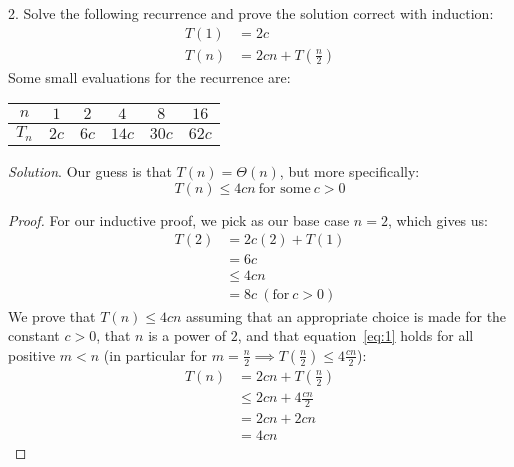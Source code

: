 \documentclass{scrartcl}
\begin{document}
\begin{flushleft}
    2. Solve the following recurrence and prove the solution correct with induction:
    \begin{align*}
        T(1) &= 2c\\
        T(n) &= 2cn + T(\frac{n}{2})
    \end{align*}
    Some small evaluations for the recurrence are:
    \medskip
    \begin{center}
        \begin{tabular}{|c|c|c|c|c|c|}
            \hline
            $n$ & $1$ & $2$ & $4$ & $8$ & $16$\\
            \hline
            $T_n$ & $2c$ & $6c$ & $14c$ & $30c$ & $62c$\\
            \hline
        \end{tabular}
    \end{center}
    \medskip
    \textit{Solution}. Our guess is that $T(n) = \Theta(n)$, but more specifically:
    \begin{equation}
        T(n) \leq 4cn\ \text{for some}\ c > 0
        \label{eq:1}
    \end{equation}
    \begin{proof}
        For our inductive proof, we pick as our base case $n = 2$, which gives us:
        \begin{align*}
            T(2) &= 2c(2) + T(1)\\
            &= 6c\\
            &\leq 4cn\\
            &= 8c\ (\text{for}\ c > 0)
        \end{align*}
        We prove that $T(n) \leq 4cn$ assuming that an appropriate choice is made for the constant
        $c > 0$, that $n$ is a power of $2$, and that equation~\ref{eq:1} holds for all positive $m
        < n$ (in particular for $m = \frac{n}{2} \implies T(\frac{n}{2}) \leq 4\frac{cn}{2}$):
        \begin{align*}
            T(n) &= 2cn + T(\frac{n}{2})\\
            &\leq 2cn + 4\frac{cn}{2}\\
            &= 2cn + 2cn\\
            &= 4cn
        \end{align*}
    \end{proof}

\end{flushleft}
\end{document}
